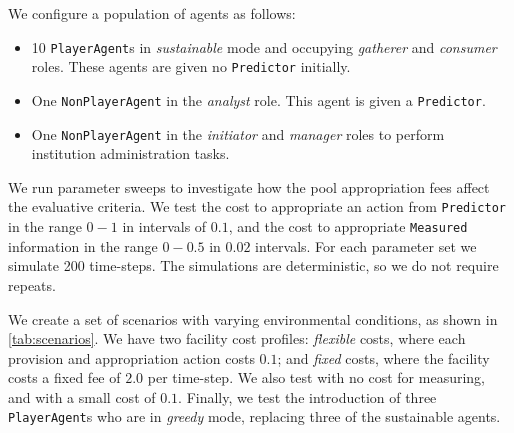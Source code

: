 We configure a population of agents as follows:

\begin{itemize}
\item 10 \texttt{PlayerAgent}s in \emph{sustainable} mode and occupying \emph{gatherer} and \emph{consumer} roles. These agents are given no \texttt{Predictor} initially.
\item One \texttt{NonPlayerAgent} in the \emph{analyst} role. This agent is given a \texttt{Predictor}.
\item One \texttt{NonPlayerAgent} in the \emph{initiator} and \emph{manager} roles to perform institution administration tasks.
\end{itemize}

We run parameter sweeps to investigate how the pool appropriation fees
affect the evaluative criteria. We test the cost to appropriate an action from
\texttt{Predictor} in the range $0-1$ in intervals of $0.1$, and the cost to
appropriate \texttt{Measured} information in the range $0-0.5$ in $0.02$
intervals. For each parameter set we simulate 200 time-steps. The simulations
are deterministic, so we do not require repeats.

We create a set of scenarios with varying environmental conditions, as shown
in \autoref{tab:scenarios}. We have two facility cost profiles:
\emph{flexible} costs, where each provision and appropriation action costs
$0.1$; and \emph{fixed} costs, where the facility costs a fixed fee of $2.0$ per
time-step. We also test with no cost for measuring, and with a small cost of
$0.1$. Finally, we test the introduction of three \texttt{PlayerAgent}s who are in
\emph{greedy} mode, replacing three of the sustainable agents.




